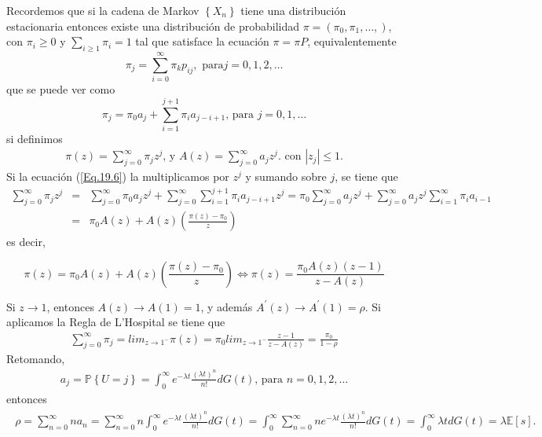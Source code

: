 \documentclass{article}
\newcommand{\esp}{\mathbb{E}}
\newcommand{\prob}{\mathbb{P}}
\numberwithin{equation}{section}
\begin{document}
Recordemos que si la cadena de Markov $\left\{X_{n}\right\}$ tiene una distribuci\'on estacionaria entonces existe una distribuci\'on de probabilidad $\pi=\left(\pi_{0},\pi_{1},\ldots,\right)$, con $\pi_{i}\geq0$ y $\sum_{i\geq1}\pi_{i}=1$ tal que satisface la
ecuaci\'on $\pi=\pi P$, equivalentemente
\begin{equation}\label{Eq.18.9}
\pi_{j}=\sum_{i=0}^{\infty}\pi_{k}p_{ij},\textrm{ para
}j=0,1,2,\ldots
\end{equation}
que se puede ver como
\begin{equation}\label{Eq.19.6}
\pi_{j}=\pi_{0}a_{j}+\sum_{i=1}^{j+1}\pi_{i}a_{j-i+1}\textrm{,
para }j=0,1,\ldots
\end{equation}
si definimos
\begin{eqnarray}
\pi\left(z\right)=\sum_{j=0}^{\infty}\pi_{j}z^{j}\textrm{, y } 
A\left(z\right)=\sum_{j=0}^{\infty}a_{j}z^{j}\textrm{. con }|z_{j}|\leq1.
\end{eqnarray}
 Si la ecuaci\'on (\ref{Eq.19.6}) la multiplicamos por $z^{j}$ y sumando sobre $j$, se tiene que
\begin{eqnarray*}
\sum_{j=0}^{\infty}\pi_{j}z^{j}&=&\sum_{j=0}^{\infty}\pi_{0}a_{j}z^{j}+\sum_{j=0}^{\infty}\sum_{i=1}^{j+1}\pi_{i}a_{j-i+1}z^{j}=\pi_{0}\sum_{j=0}^{\infty}a_{j}z^{j}+\sum_{j=0}^{\infty}a_{j}z^{j}\sum_{i=1}^{\infty}\pi_{i}a_{i-1}\\
&=&\pi_{0}A\left(z\right)+A\left(z\right)\left(\frac{\pi\left(z\right)-\pi_{0}}{z}\right)
\end{eqnarray*}
es decir,

\begin{equation}
\pi\left(z\right)=\pi_{0}A\left(z\right)+A\left(z\right)\left(\frac{\pi\left(z\right)-\pi_{0}}{z}\right)\Leftrightarrow\pi\left(z\right)=\frac{\pi_{0}A\left(z\right)\left(z-1\right)}{z-A\left(z\right)}
\end{equation}

Si $z\rightarrow1$, entonces $A\left(z\right)\rightarrow A\left(1\right)=1$, y adem\'as $A^{'}\left(z\right)\rightarrow A^{'}\left(1\right)=\rho$. Si aplicamos la Regla de L'Hospital se tiene que
\begin{eqnarray}
\sum_{j=0}^{\infty}\pi_{j}=lim_{z\rightarrow1^{-}}\pi\left(z\right)=\pi_{0}lim_{z\rightarrow1^{-}}\frac{z-1}{z-A\left(z\right)}=\frac{\pi_{0}}{1-\rho}
\end{eqnarray}
Retomando,
\begin{eqnarray*}
a_{j}=\prob\left\{U=j\right\}=\int_{0}^{\infty}e^{-\lambda
t}\frac{\left(\lambda t\right)^{n}}{n!}dG\left(t\right)\textrm{,
para }n=0,1,2,\ldots
\end{eqnarray*}
entonces
\begin{eqnarray}
\begin{array}{l}
\rho=\sum_{n=0}^{\infty}na_{n}=\sum_{n=0}^{\infty}n\int_{0}^{\infty}e^{-\lambda t}\frac{\left(\lambda t\right)^{n}}{n!}dG\left(t\right)=\int_{0}^{\infty}\sum_{n=0}^{\infty}ne^{-\lambda t}\frac{\left(\lambda
t\right)^{n}}{n!}dG\left(t\right)=\int_{0}^{\infty}\lambda tdG\left(t\right)=\lambda\esp\left[s\right].
\end{array}
\end{eqnarray}
\end{document}
